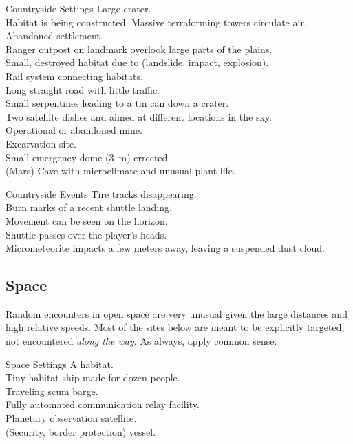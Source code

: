 \begin{tableone}{Countryside Settings}
Large crater.\\
Habitat is being constructed.
Massive terraforming towers circulate air.\\
Abandoned settlement.\\
Ranger outpost on landmark overlook large parts of the plains.\\
Small, destroyed habitat due to (landslide, impact, explosion).\\
Rail system connecting habitats.\\
Long straight road with little traffic.\\
Small serpentines leading to a tin can down a crater.\\
Two satellite dishes and aimed at different locations in the sky.\\
Operational or abandoned mine.\\
Excarvation site.\\
Small emergency dome (\SI{3}{\m}) errected.\\
(Mars) Cave with microclimate and unusual plant life.\\
\end{tableone}


\begin{tableone}{Countryside Events}
Tire tracks disappearing.\\
Burn marks of a recent shuttle landing.\\
Movement can be seen on the horizon.\\
Shuttle passes over the player's heads.\\
Micrometeorite impacts a few meters away, leaving a suspended dust cloud.\\
\end{tableone}



\subsection*{Space}

Random encounters in open space are very unusual given the large distances and high relative speeds.
Most of the sites below are meant to be explicitly targeted, not encountered \textit{along the way}.
As always, apply common sense.

\begin{tableone}{Space Settings}
A habitat.\\
Tiny habitat ship made for dozen people.\\
Traveling scum barge.\\
Fully automated communication relay facility.\\
Planetary observation satellite.\\
(Security, border protection) vessel.\\
\end{tableone}

